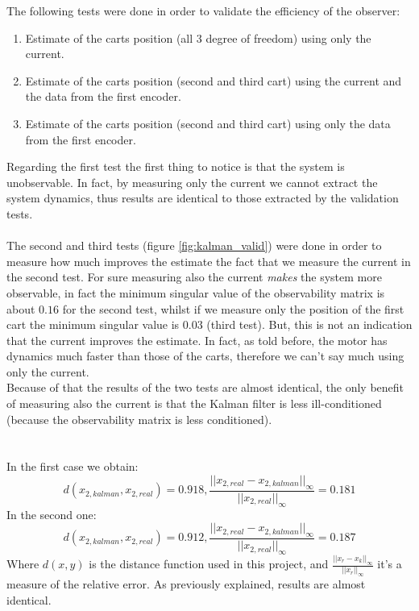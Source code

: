 The following tests were done in order to validate the efficiency of the observer:
\begin{enumerate}
\item Estimate of the carts position (all 3 degree of freedom) using only the current.
\item Estimate of the carts position (second and third cart) using the current and the data from the first encoder.
\item Estimate of the carts position (second and third cart) using only the data from the first encoder.
\end{enumerate}
Regarding the first test the first thing to notice is that the system is unobservable. In fact, by measuring only the current we cannot extract the system dynamics, thus results are identical to those extracted by the validation tests. \\ \\
The second and third tests (figure \ref{fig:kalman_valid}) were done in order to measure how much improves the estimate the fact that we measure the current in the second test. For sure measuring also the current \emph{makes} the system more observable, in fact the minimum singular value of the observability matrix is about $0.16$ for the second test, whilst if we measure only the position of the first cart the minimum singular value is $0.03$ (third test). But, this is not an indication that the current improves the estimate. In fact, as told before, the motor  has dynamics much faster than those of the carts, therefore we can't say much using only the current.\\Because of that the results of the two tests are almost identical, the only benefit of measuring also the current is that the Kalman filter is less ill-conditioned (because the observability matrix is less conditioned).\\ \\ \\
In the first case we obtain:
$$d(x_{2,kalman},x_{2,real}) = 0.918, \frac{||x_{2,real}-x_{2,kalman}||_{\infty}}{||x_{2,real}||_{\infty}}=0.181$$
In the second one:
$$d(x_{2,kalman},x_{2,real}) = 0.912, \frac{||x_{2,real}-x_{2,kalman}||_{\infty}}{||x_{2,real}||_{\infty}}=0.187$$
Where $d(x,y)$ is the distance function used in this project, and $\frac{||x_{r}-x_{k}||_{\infty}}{||x_{r}||_{\infty}}$ it's a measure of the relative error. As previously explained, results are almost identical.
